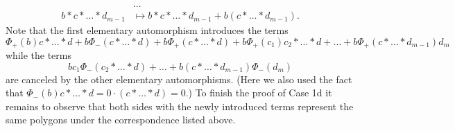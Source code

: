 \documentclass[11pt]{amsart}
\makeatletter
\renewenvironment{proof}[1][\proofname] {\par\pushQED{\qed}{\normalfont\bfseries\topsep6\p@\@plus6\p@\relax #1\@addpunct{.} }}{\popQED\endtrivlist\@endpefalse}
\theoremstyle{mystyle}
\newcommand{\<}{\langle}
\renewcommand{\>}{\rangle}
\makeatother
\begin{document}
\begin{proof}
\begin{align*}
        &\dots \\
        b * c * \dots * d_{m-1} &\mapsto b * c * \dots * d_{m-1} + b (c * \dots * d_{m-1}).
    \end{align*} Note that the first elementary automorphism introduces the terms \[\Phi_+(b) c * \dots * d + b \Phi_-(c * \dots * d) + b \Phi_+(c * \dots * d) + b \Phi_+(c_1) c_2 * \dots * d + \dots + b \Phi_+(c * \dots * d_{m-1}) d_m\] while the terms \[b c_1\Phi_-(c_2 * \dots * d) + \dots + b (c * \dots * d_{m-1}) \Phi_-(d_m)\] are canceled by the other elementary automorphisms. (Here we also used the fact that $\Phi_-(b) c * \dots * d = 0 \cdot (c * \dots * d) = 0$.) To finish the proof of Case 1d it remains to observe that both sides with the newly introduced terms represent the same polygons under the correspondence listed above. \\


\end{proof}
\end{document}
